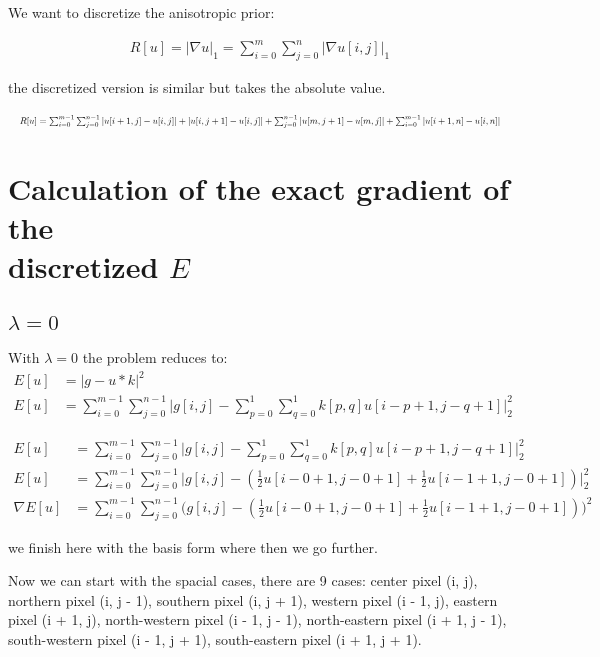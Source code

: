 \documentclass[12pt]{article}
\begin{document}
We want to discretize the anisotropic prior:

\begin{align}
    R[u] = | \nabla u |_1 = \sum_{i=0}^{m} \sum_{j=0}^{n} | \nabla u[i,j] |_1
\end{align}

\noindent the discretized version is similar but takes the absolute value.

\begin{align}
    \resizebox{1.0\hsize}{!}{$
        R[u] = \sum_{i=0}^{m-1} \sum_{j=0}^{n-1} |u[i + 1,j] - u[i,j]| + |u[i, j + 1] - u[i,j]| + \sum_{j=0}^{n-1} |u[m, j + 1] - u[m,j]| + \sum_{i=0}^{m-1} |u[i + 1,n] - u[i,n]|
    $}
\end{align}


\section{Calculation of the exact gradient of the \\
         discretized $E$}

\subsection{$\lambda = 0$}

With $\lambda = 0$ the problem reduces to:
\begin{align*}
    E[u] &= |g - u * k|^2 \\
    E[u] &= \sum_{i=0}^{m-1} \sum_{j=0}^{n-1} \Big| g[i,j] - \sum_{p=0}^{1} \sum_{q=0}^{1} k[p,q] u[i-p + 1,j - q + 1] \Big|^2_2
\end{align*}

\begin{align*}
    E[u] &= \sum_{i=0}^{m-1} \sum_{j=0}^{n-1} \Big| g[i,j] - \sum_{p=0}^{1} \sum_{q=0}^{1} k[p,q] u[i-p + 1,j - q + 1] \Big|^2_2 \\
    E[u] &= \sum_{i=0}^{m-1} \sum_{j=0}^{n-1} \Big| g[i,j] - ( \frac{1}{2} u[i-0 + 1,j - 0 + 1] + \frac{1}{2} u[i-1 + 1,j - 0 + 1] ) \Big|^2_2 \\
    \nabla E[u] &= \sum_{i=0}^{m-1} \sum_{j=0}^{n-1} \Big( g[i,j] - ( \frac{1}{2} u[i-0 + 1,j - 0 + 1] + \frac{1}{2} u[i-1 + 1,j - 0 + 1] ) \Big)^2
\end{align*}

\noindent we finish here with the basis form where then we go further. 

Now we can start with the spacial cases, there are 9 cases: center pixel (i, j), northern pixel (i, j - 1), southern pixel (i, j + 1), western pixel  (i - 1, j), eastern pixel  (i + 1, j), north-western pixel (i - 1, j - 1), north-eastern pixel (i + 1, j - 1), south-western pixel (i - 1, j + 1), south-eastern pixel  (i + 1, j + 1).
\end{document}
